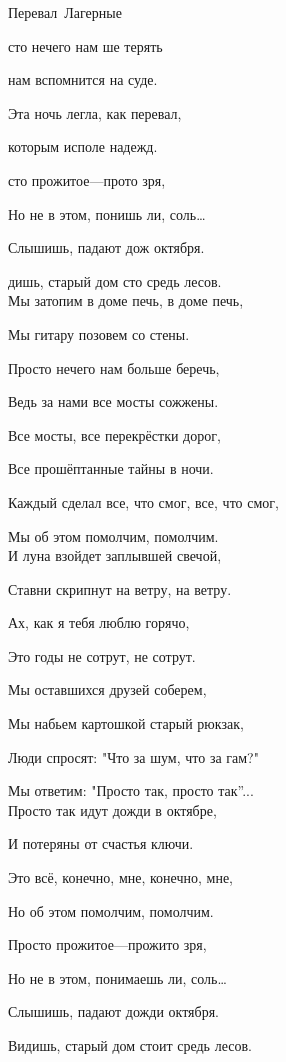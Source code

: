 \documentclass[11pt,a5paper]{book}
\begin{document}
\begin{song}{Перевал}{}{~}{Лагерные}{}{}

сто нечего нам ше терять\par
{} нам вспомнится на  суде.\par
Эта ночь легла, как  перевал,\par
{} которым исполе надежд.\par
{}сто прожитое—прото зря, \par
Но не в этом, понишь ли, соль… \par
Слышишь, падают дож октября.\par
{}дишь, старый дом сто средь лесов.\\

Мы затопим в доме печь, в доме печь,\par
Мы гитару позовем со стены.\par
Просто нечего нам больше беречь,\par
Ведь за нами все мосты сожжены.\par
Все мосты, все перекрёстки дорог,\par
Все прошёптанные тайны в ночи.\par
Каждый сделал все, что смог, все, что смог,\par
Мы об этом помолчим, помолчим.\\


И луна взойдет заплывшей свечой,\par
Ставни скрипнут  на ветру, на ветру.\par
Ах, как я тебя люблю горячо,\par
Это годы не сотрут, не сотрут.\par
Мы оставшихся друзей соберем,\par
Мы набьем картошкой старый рюкзак,\par
Люди спросят: "Что за шум, что за гам?"\par
Мы ответим: "Просто так,  просто так”...\\


\newpage
    Просто так идут дожди в октябре,\par
    И потеряны от счастья ключи.\par
    Это всё, конечно, мне, конечно, мне,\par
    Но об этом помолчим, помолчим.\par
    Просто прожитое—прожито зря,\par
    Но не в этом, понимаешь ли, соль…\par
    Слышишь, падают дожди октября.\par
    Видишь, старый дом стоит средь лесов.\\
    

\end{song}
\end{document}
